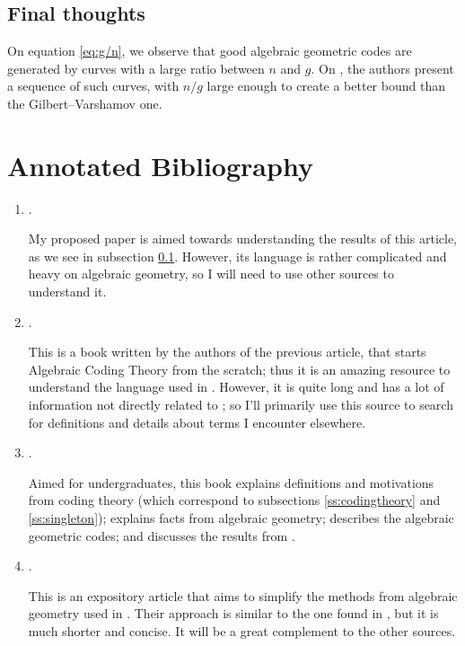 \documentclass[11pt, letterpaper]{amsart}
\begin{document}
\subsection{Final thoughts} \label{ss:tvz} On equation \eqref{eq:g/n}, we observe that good algebraic geometric codes are generated by curves with a large ratio between $n$ and $g$. On \cite{TVZ82}, the authors present a sequence of such curves, with $n/g$ large enough to create a better bound than the Gilbert--Varshamov one.

\section{Annotated Bibliography}

\begin{enumerate}
    \item[\textbf{\cite{TVZ82}}] .

    My proposed paper is aimed towards understanding the results of this article, as we see in subsection \ref{ss:tvz}. However, its language is rather complicated and heavy on algebraic geometry, so I will need to use other sources to understand it.
    
    \item[\textbf{\cite{TVN07}}] .
    
    This is a book written by the authors of the previous article, that starts Algebraic Coding Theory from the scratch; thus it is an amazing resource to understand the language used in \cite{TVZ82}. However, it is quite long and has a lot of information not directly related to \cite{TVZ82}; so I'll primarily use this source to search for definitions and details about terms I encounter elsewhere.
    
    \item[\textbf{\cite{Wal00}}] .
    
    Aimed for undergraduates, this book explains definitions and motivations from coding theory (which correspond to subsections \ref{ss:codingtheory} and \ref{ss:singleton}); explains facts from algebraic geometry; describes the algebraic geometric codes; and discusses the results from \cite{TVZ82}.
    
    \item[\textbf{\cite{LS87}}] .
    
    This is an expository article that aims to simplify the methods from algebraic geometry used in \cite{TVZ82}. Their approach is similar to the one found in \cite{Wal00}, but it is much shorter and concise. It will be a great complement to the other sources. 
    
\end{enumerate}
\end{document}
